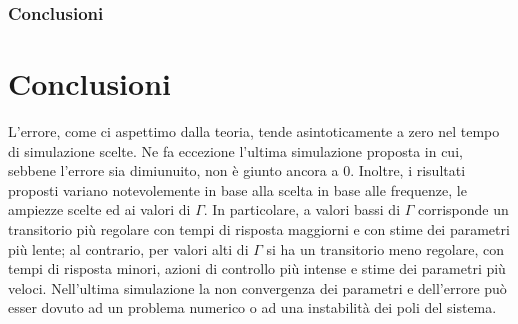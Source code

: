 \documentclass{beamer}
\begin{document}
\begin{frame}
\begin{figure}
        \hspace{0.2cm}
    \end{figure}
\end{frame}
\begin{frame}
	\frametitle{Conclusioni}
	\section{Conclusioni}
    L'errore, come ci aspettimo dalla teoria, tende asintoticamente a zero nel tempo di simulazione scelte. Ne fa eccezione l'ultima simulazione proposta in cui, sebbene l'errore sia dimiunuito, non è giunto ancora a 0. Inoltre, i risultati proposti variano notevolemente in base alla scelta in base alle frequenze, le ampiezze scelte ed ai valori di \(\Gamma \). In particolare, a valori bassi di \(\Gamma \) corrisponde un transitorio più regolare con tempi di risposta maggiorni e con stime dei parametri più lente; al contrario, per valori alti di \(\Gamma \) si ha un transitorio meno regolare, con tempi di risposta minori, azioni di controllo più intense e stime dei parametri più veloci.
    Nell'ultima simulazione la non convergenza dei parametri e dell'errore può esser dovuto ad un problema numerico o ad una instabilità dei poli del sistema.
\end{frame}
\end{document}
